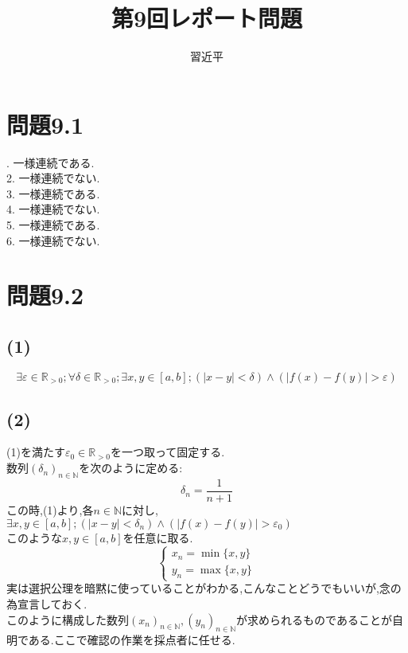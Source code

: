 \documentclass{jreport}
\begin{document}
\title{第9回レポート問題}
\author{習近平}
\maketitle
\newpage
\tableofcontents
{}
\newpage
\setcounter{chapter}{9}
\section{問題9.1}
. 一様連続である.\\
2. 一様連続でない.\\
3. 一様連続である.\\
4. 一様連続でない.\\
5. 一様連続である.\\
6. 一様連続でない.\\
\section{問題9.2}
\subsection{(1)}
$$
\exists \varepsilon \in \mathbb{R}_{>0};\forall \delta \in \mathbb{R}_{>0}; \exists x,y \in [a,b]; (|x-y|<\delta) \land (|f(x) -f(y)|>\varepsilon)
$$
\subsection{(2)}
(1)を満たす$\varepsilon_0 \in \mathbb{R}_{>0}$を一つ取って固定する.\\
数列$(\delta_n)_{n \in \mathbb{N}}$を次のように定める:\\
$$
\delta_n = \frac{1}{n+1}
$$
この時,(1)より,各$n \in \mathbb{N}$に対し,\\
$\exists x,y \in [a,b]; (|x-y|<\delta_n) \land (|f(x) -f(y)|>\varepsilon_0)$\\このような$x,y \in [a,b]$を任意に取る.\\
\begin{equation}
	\begin{cases}
		x_n =\min \{x,y\} \\
		y_n =\max \{x,y\}
	\end{cases}
\end{equation}
実は選択公理を暗黙に使っていることがわかる,こんなことどうでもいいが,念の為宣言しておく.\\
このように構成した数列$(x_n)_{n\in \mathbb{N}},(y_n)_{n \in \mathbb{N}}$が求められるものであることが自明である.ここで確認の作業を採点者に任せる.\\
\end{document}

